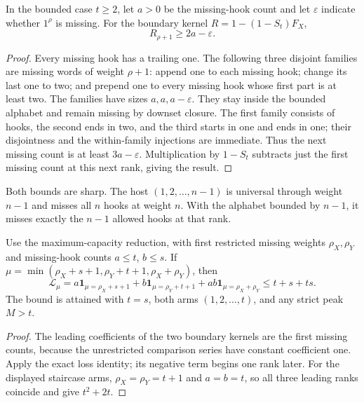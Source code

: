 \begin{corollary}
In the bounded case $t\ge2$, let $a>0$ be the missing-hook
count and let $\varepsilon$ indicate whether $1^\rho$ is
missing. For the boundary kernel $R=1-(1-S_t)F_X$,
\[
                          R_{\rho+1}\ge2a-\varepsilon.
\]
\end{corollary}
\begin{proof}
Every missing hook has a trailing one. The following three
disjoint families are missing words of weight $\rho+1$:
append one to each missing hook; change its last one to two;
and prepend one to every missing hook whose first part is
at least two. The families have sizes $a,a,a-\varepsilon$.
They stay inside the bounded alphabet and remain missing by
downset closure. The first family consists of hooks, the
second ends in two, and the third starts in one and ends in
one; their disjointness and the within-family injections
are immediate. Thus the next missing count is at least
$3a-\varepsilon$. Multiplication by $1-S_t$ subtracts just
the first missing count at this next rank, giving the result.
\end{proof}

Both bounds are sharp. The host $(1,2,\ldots,n-1)$ is
universal through weight $n-1$ and misses all $n$ hooks at
weight $n$. With the alphabet bounded by $n-1$, it misses
exactly the $n-1$ allowed hooks at that rank.

\begin{corollary}
Use the maximum-capacity reduction, with first restricted
missing weights $\rho_X,\rho_Y$ and missing-hook counts
$a\le t$, $b\le s$. If
$\mu=\min(\rho_X+s+1,\rho_Y+t+1,\rho_X+\rho_Y)$, then
\[
 \mathcal L_\mu
 =a\mathbf1_{\mu=\rho_X+s+1}
  +b\mathbf1_{\mu=\rho_Y+t+1}
  +ab\mathbf1_{\mu=\rho_X+\rho_Y}
 \le t+s+ts.
\]
The bound is attained with $t=s$, both arms $(1,2,\ldots,t)$,
and any strict peak $M>t$.
\end{corollary}
\begin{proof}
The leading coefficients of the two boundary kernels are
the first missing counts, because the unrestricted comparison
series have constant coefficient one. Apply the exact loss
identity; its negative term begins one rank later. For the
displayed staircase arms, $\rho_X=\rho_Y=t+1$ and $a=b=t$,
so all three leading ranks coincide and give $t^2+2t$.
\end{proof}
